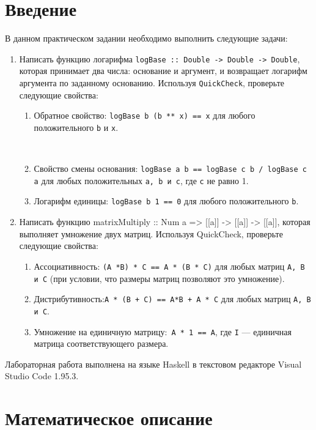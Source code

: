 \documentclass[10pt,a4paper,final]{article} %
\begin{document}
\tableofcontents

\newpage

\section* {Введение}
\par В данном практическом задании необходимо выполнить следующие задачи:
\begin{enumerate}
	\item Написать функцию логарифма \texttt{logBase :: Double -> Double -> Double}, которая принимает два числа: основание и аргумент, и возвращает логарифм аргумента по заданному основанию. Используя \texttt{QuickCheck}, проверьте следующие свойства:
	\begin{enumerate}
		\item Обратное свойство: \texttt{logBase b (b ** x) == х} для любого положительного \texttt{b} и \texttt{х}.
		
		﻿﻿﻿\item Свойство смены основания: \texttt{logBase a b == logBase c b / logBase с а} для любых положительных \texttt{а, b и с}, где \texttt{с} не равно 1.
		﻿﻿﻿
		\item Логарифм единицы: \texttt{logBase b 1 == 0} для любого положительного \texttt{b}.
	\end{enumerate}
	
	\item Написать функцию matrixMultiply :: Num a => [[a]] -> [[a]] -> [[a]], которая
	выполняет умножение двух матриц. Используя QuickCheck, проверьте следующие свойства:
	\begin{enumerate}
		\item ﻿﻿Ассоциативность: \texttt{(А *B) * С == А * (В * С)} для любых матриц \texttt{А, В и С} (при условии, что размеры матриц позволяют это умножение).
		
		\item ﻿﻿﻿Дистрибутивность:\texttt{А * (B + C) == А*В + А * С} для любых матриц \texttt{А, В и С}.
		﻿﻿﻿\item Умножение на единичную матрицу:\texttt{ А * 1 == А}, где \texttt{I} — единичная матрица соответствующего размера.
	\end{enumerate}
\end{enumerate}


Лабораторная работа выполнена на языке Haskell в текстовом редакторе Visual Studio Code 1.95.3.


\section{Математическое описание}
\end{document}

